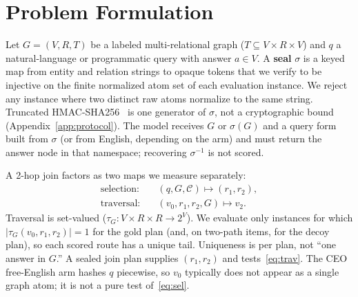 \documentclass{article}
\begin{document}
\section{Problem Formulation}
\label{sec:problem}

Let $G=(V,R,T)$ be a labeled multi-relational graph
($T\subseteq V\times R\times V$) and $q$ a natural-language or programmatic
query with answer $a\in V$. A \textbf{seal} $\sigma$ is a keyed map from
entity and relation strings to opaque tokens that we verify to be injective
on the finite normalized atom set of each evaluation instance. We reject any
instance where two distinct raw atoms normalize to the same string.
Truncated HMAC-SHA256~\citep{krawczyk1997hmac} is one generator of $\sigma$, not a cryptographic
bound (Appendix~\ref{app:protocol}). The model receives $G$ or $\sigma(G)$
and a query form built from $\sigma$ (or from English, depending on the arm)
and must return the answer node in that namespace; recovering $\sigma^{-1}$
is not scored.

A 2-hop join factors as two maps we measure separately:
\begin{align}
\text{selection:}&\quad (q,G,\mathcal{C})\mapsto (r_1,r_2), \label{eq:sel}\\
\text{traversal:}&\quad (v_0,r_1,r_2,G)\mapsto v_2. \label{eq:trav}
\end{align}
Traversal is set-valued ($\tau_G\colon V\times R\times R\to 2^V$).
We evaluate only instances for which $|\tau_G(v_0,r_1,r_2)|=1$ for the gold
plan (and, on two-path items, for the decoy plan), so each scored route has
a unique tail. Uniqueness is per plan, not ``one answer in $G$.''
A sealed join plan supplies $(r_1,r_2)$ and tests~\eqref{eq:trav}.
The CEO free-English arm hashes $q$ piecewise, so $v_0$ typically does not
appear as a single graph atom; it is not a pure test of~\eqref{eq:sel}.
\end{document}
